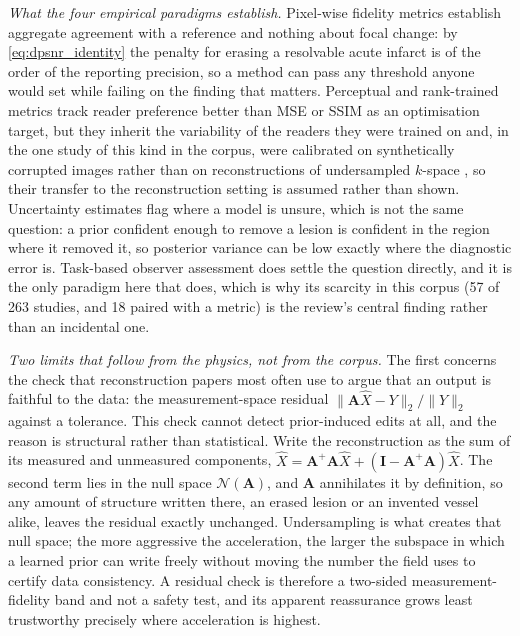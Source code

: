 \documentclass[review,authoryear]{elsarticle}
\begin{document}
\emph{What the four empirical paradigms establish.} Pixel-wise fidelity metrics
establish aggregate agreement with a reference and nothing about focal change: by
\eqref{eq:dpsnr_identity} the penalty for erasing a resolvable acute infarct is of the
order of the reporting precision, so a method can pass any threshold anyone would set
while failing on the finding that matters. Perceptual and rank-trained metrics track
reader preference better than MSE or SSIM as an optimisation target, but they inherit
the variability of the readers they were trained on and, in the one study of this kind
in the corpus, were calibrated on synthetically corrupted images rather than on
reconstructions of undersampled $k$-space \citep{tang2025incorporating}, so their
transfer to the reconstruction setting is assumed rather than shown. Uncertainty
estimates flag where a model is unsure, which is not the same question: a prior
confident enough to remove a lesion is confident in the region where it removed it, so
posterior variance can be low exactly where the diagnostic error is. Task-based
observer assessment does settle the question directly, and it is the only paradigm here
that does, which is why its scarcity in this corpus (57 of 263 studies, and 18 paired
with a metric) is the review's central finding rather than an incidental one.

\emph{Two limits that follow from the physics, not from the corpus.} The first concerns
the check that reconstruction papers most often use to argue that an output is faithful
to the data: the measurement-space residual
$\|\mathbf{A}\hat{X} - Y\|_2/\|Y\|_2$ against a tolerance. This check cannot detect
prior-induced edits at all, and the reason is structural rather than statistical. Write
the reconstruction as the sum of its measured and unmeasured components,
$\hat{X} = \mathbf{A}^{+}\mathbf{A}\hat{X} + (\mathbf{I}-\mathbf{A}^{+}\mathbf{A})\hat{X}$.
The second term lies in the null space $\mathcal{N}(\mathbf{A})$, and $\mathbf{A}$
annihilates it by definition, so any amount of structure written there, an erased lesion
or an invented vessel alike, leaves the residual exactly unchanged. Undersampling is
what creates that null space; the more aggressive the acceleration, the larger the
subspace in which a learned prior can write freely without moving the number the field
uses to certify data consistency. A residual check is therefore a two-sided
measurement-fidelity band and not a safety test, and its apparent reassurance grows
least trustworthy precisely where acceleration is highest.
\end{document}
